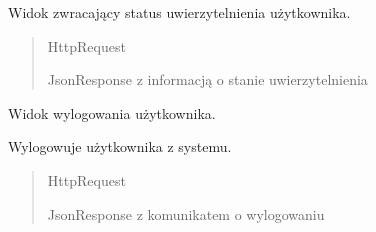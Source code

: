 \documentclass[letterpaper,10pt,polish]{sphinxmanual}
\begin{document}

\begin{fulllineitems}
\label{\detokenize{mainApp:mainApp.views.status}}
\pysigstartsignatures
{}
\pysigstopsignatures
\sphinxAtStartPar
Widok zwracający status uwierzytelnienia użytkownika.
\begin{quote}\begin{description}
\sphinxAtStartPar
{} \textendash{} HttpRequest

\sphinxAtStartPar
JsonResponse z informacją o stanie uwierzytelnienia

\end{description}\end{quote}

\end{fulllineitems}


\begin{fulllineitems}
\label{\detokenize{mainApp:mainApp.views.user_logout}}
\pysigstartsignatures
{}
\pysigstopsignatures
\sphinxAtStartPar
Widok wylogowania użytkownika.

\sphinxAtStartPar
Wylogowuje użytkownika z systemu.
\begin{quote}\begin{description}
\sphinxAtStartPar
{} \textendash{} HttpRequest

\sphinxAtStartPar
JsonResponse z komunikatem o wylogowaniu

\end{description}\end{quote}

\end{fulllineitems}
\end{document}
